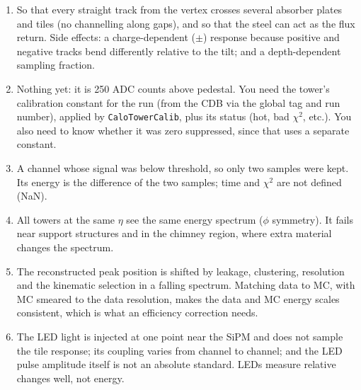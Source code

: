 \documentclass[11pt,letterpaper]{article}
\newcommand{\code}[1]{\texttt{#1}}
\begin{document}
\begin{enumerate}
\item So that every straight track from the vertex crosses several absorber plates and tiles (no channelling along gaps), and so that the steel can act as the flux return. Side effects: a charge-dependent ($\pm$) response because positive and negative tracks bend differently relative to the tilt; and a depth-dependent sampling fraction.
\item Nothing yet: it is 250 ADC counts above pedestal. You need the tower's calibration constant for the run (from the CDB via the global tag and run number), applied by \code{CaloTowerCalib}, plus its status (hot, bad $\chi^2$, etc.). You also need to know whether it was zero suppressed, since that uses a separate constant.
\item A channel whose signal was below threshold, so only two samples were kept. Its energy is the difference of the two samples; time and $\chi^2$ are not defined (NaN).
\item All towers at the same $\eta$ see the same energy spectrum ($\phi$ symmetry). It fails near support structures and in the chimney region, where extra material changes the spectrum.
\item The reconstructed peak position is shifted by leakage, clustering, resolution and the kinematic selection in a falling spectrum. Matching data to MC, with MC smeared to the data resolution, makes the data and MC energy scales consistent, which is what an efficiency correction needs.
\item The LED light is injected at one point near the SiPM and does not sample the tile response; its coupling varies from channel to channel; and the LED pulse amplitude itself is not an absolute standard. LEDs measure relative changes well, not energy.
\end{enumerate}

\end{document}
